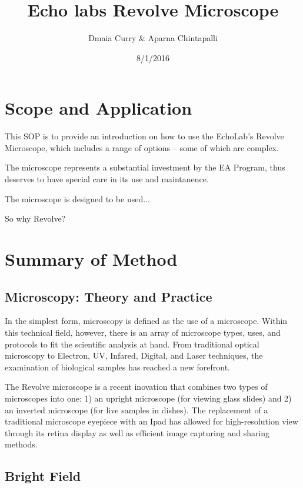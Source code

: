 \documentclass[12pt]{../SOP2}
\title{Echo labs Revolve Microscope}
\author{Dmaia Curry \& Aparna Chintapalli}
\date{8/1/2016}
\begin{document}


\maketitle

\section{Scope and Application}

\NP This SOP is to provide an introduction on how to use the EchoLab's Revolve Microscope, which includes a range of options -- some of which are complex.

\NP The microscope represents a substantial investment by the EA Program, thus deserves to have special care in its use and maintanence. 

\NP The microscope is designed to be used...

\NP So why Revolve?

\section{Summary of Method}

\subsection*{Microscopy: Theory and Practice}

\NP In the simplest form, microscopy is defined as the use of a microscope. Within this technical field, however, there is an array of microscope types, uses, and protocols to fit the scientific analysis at hand. From traditional optical microscopy to Electron, UV, Infared, Digital, and Laser techniques, the examination of biological samples has reached a new forefront. 

\NP The Revolve microscope is a recent inovation that combines two types of microscopes into one: 1) an upright microscope (for viewing glass slides) and 2) an inverted microscope (for live samples in dishes). The replacement of a traditional microscope eyepiece with an Ipad has allowed for high-resolution view through its retina display as well as efficient image capturing and sharing methods.

\subsection*{Bright Field}
\end{document}
